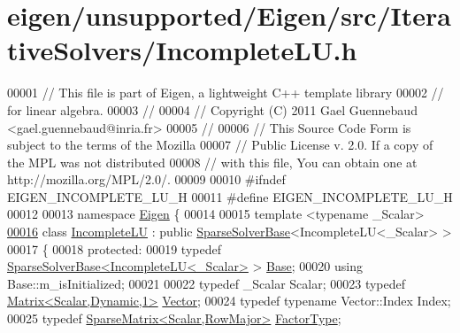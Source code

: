 \hypertarget{eigen_2unsupported_2_eigen_2src_2_iterative_solvers_2_incomplete_l_u_8h_source}{}\section{eigen/unsupported/\+Eigen/src/\+Iterative\+Solvers/\+Incomplete\+LU.h}
\label{eigen_2unsupported_2_eigen_2src_2_iterative_solvers_2_incomplete_l_u_8h_source}

\begin{DoxyCode}
00001 \textcolor{comment}{// This file is part of Eigen, a lightweight C++ template library}
00002 \textcolor{comment}{// for linear algebra.}
00003 \textcolor{comment}{//}
00004 \textcolor{comment}{// Copyright (C) 2011 Gael Guennebaud <gael.guennebaud@inria.fr>}
00005 \textcolor{comment}{//}
00006 \textcolor{comment}{// This Source Code Form is subject to the terms of the Mozilla}
00007 \textcolor{comment}{// Public License v. 2.0. If a copy of the MPL was not distributed}
00008 \textcolor{comment}{// with this file, You can obtain one at http://mozilla.org/MPL/2.0/.}
00009 
00010 \textcolor{preprocessor}{#ifndef EIGEN\_INCOMPLETE\_LU\_H}
00011 \textcolor{preprocessor}{#define EIGEN\_INCOMPLETE\_LU\_H}
00012 
00013 \textcolor{keyword}{namespace }\hyperlink{namespace_eigen}{Eigen} \{ 
00014 
00015 \textcolor{keyword}{template} <\textcolor{keyword}{typename} \_Scalar>
\hyperlink{class_eigen_1_1_incomplete_l_u}{00016} \textcolor{keyword}{class }\hyperlink{class_eigen_1_1_incomplete_l_u}{IncompleteLU} : \textcolor{keyword}{public} \hyperlink{group___sparse_core___module_class_eigen_1_1_sparse_solver_base}{SparseSolverBase}<IncompleteLU<\_Scalar> >
00017 \{
00018   \textcolor{keyword}{protected}:
00019     \textcolor{keyword}{typedef} \hyperlink{group___sparse_core___module_class_eigen_1_1_sparse_solver_base}{SparseSolverBase<IncompleteLU<\_Scalar>} > 
      \hyperlink{group___sparse_core___module}{Base};
00020     \textcolor{keyword}{using} Base::m\_isInitialized;
00021     
00022     \textcolor{keyword}{typedef} \_Scalar Scalar;
00023     \textcolor{keyword}{typedef} \hyperlink{group___core___module}{Matrix<Scalar,Dynamic,1>} \hyperlink{group___core___module}{Vector};
00024     \textcolor{keyword}{typedef} \textcolor{keyword}{typename} Vector::Index Index;
00025     \textcolor{keyword}{typedef} \hyperlink{group___sparse_core___module}{SparseMatrix<Scalar,RowMajor>} 
      \hyperlink{group___sparse_core___module}{FactorType};

\end{DoxyCode}
